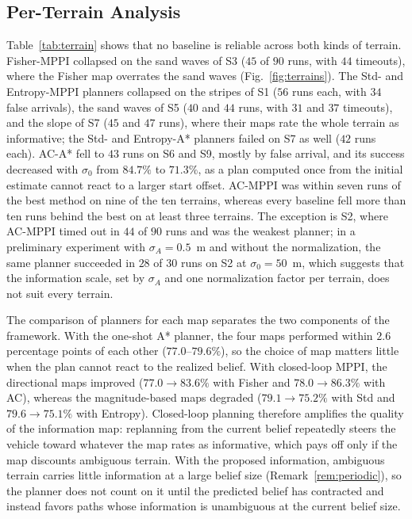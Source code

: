 \documentclass[letterpaper, 10 pt, journal, twoside]{IEEEtran}
\begin{document}
\subsection{Per-Terrain Analysis}
Table~\ref{tab:terrain} shows that no baseline is reliable across both kinds of terrain. Fisher-MPPI collapsed on the sand waves of S3 ($45$ of $90$ runs, with $44$ timeouts), where the Fisher map overrates the sand waves (Fig.~\ref{fig:terrains}). The Std- and Entropy-MPPI planners collapsed on the stripes of S1 ($56$ runs each, with $34$ false arrivals), the sand waves of S5 ($40$ and $44$ runs, with $31$ and $37$ timeouts), and the slope of S7 ($45$ and $47$ runs), where their maps rate the whole terrain as informative; the Std- and Entropy-A* planners failed on S7 as well ($42$ runs each). AC-A* fell to $43$ runs on S6 and S9, mostly by false arrival, and its success decreased with $\sigma_0$ from $84.7\%$ to $71.3\%$, as a plan computed once from the initial estimate cannot react to a larger start offset. AC-MPPI was within seven runs of the best method on nine of the ten terrains, whereas every baseline fell more than ten runs behind the best on at least three terrains. The exception is S2, where AC-MPPI timed out in $44$ of $90$ runs and was the weakest planner; in a preliminary experiment with $\sigma_A = 0.5$~m and without the normalization, the same planner succeeded in $28$ of $30$ runs on S2 at $\sigma_0 = 50$~m, which suggests that the information scale, set by $\sigma_A$ and one normalization factor per terrain, does not suit every terrain.

The comparison of planners for each map separates the two components of the framework. With the one-shot A* planner, the four maps performed within $2.6$ percentage points of each other ($77.0$--$79.6\%$), so the choice of map matters little when the plan cannot react to the realized belief. With closed-loop MPPI, the directional maps improved ($77.0 \rightarrow 83.6\%$ with Fisher and $78.0 \rightarrow 86.3\%$ with AC), whereas the magnitude-based maps degraded ($79.1 \rightarrow 75.2\%$ with Std and $79.6 \rightarrow 75.1\%$ with Entropy). Closed-loop planning therefore amplifies the quality of the information map: replanning from the current belief repeatedly steers the vehicle toward whatever the map rates as informative, which pays off only if the map discounts ambiguous terrain. With the proposed information, ambiguous terrain carries little information at a large belief size (Remark~\ref{rem:periodic}), so the planner does not count on it until the predicted belief has contracted and instead favors paths whose information is unambiguous at the current belief size.
\end{document}
